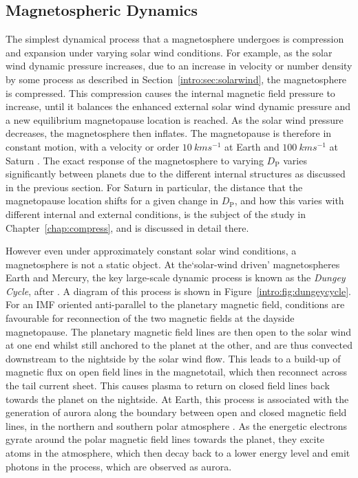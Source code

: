 {\subsection{Magnetospheric Dynamics}
The simplest dynamical process that a magnetosphere undergoes is compression and expansion under varying solar wind conditions. For example, as the solar wind dynamic pressure increases, due to an increase in velocity or number density by some process as described in Section~\ref{intro:sec:solarwind}, the magnetosphere is compressed. This compression causes the internal magnetic field pressure to increase, until it balances the enhanced external solar wind dynamic pressure and a new equilibrium magnetopause location is reached. As the solar wind pressure decreases, the magnetosphere then inflates. The magnetopause is therefore in constant motion, with a velocity or order $\SI{10}{kms^{-1}}$ at Earth \citep{berchem1982} and $\SI{100}{kms^{-1}}$ at Saturn \citep{masters2011}. The exact response of the magnetosphere to varying $D_\mathrm{P}$ varies significantly between planets due to the different internal structures as discussed in the previous section. For Saturn in particular, the distance that the magnetopause location shifts for a given change in $D_\mathrm{P}$, and how this varies with different internal and external conditions, is the subject of the study in Chapter~\ref{chap:compress}, and is discussed in detail there.

However even under approximately constant solar wind conditions, a magnetosphere is not a static object. At the`solar-wind driven' magnetospheres Earth and Mercury, the key large-scale dynamic process is known as the \textit{Dungey Cycle}, after \citet{dungey1961}. A diagram of this process is shown in Figure~\ref{intro:fig:dungeycycle}. For an IMF oriented anti-parallel to the planetary magnetic field, conditions are favourable for reconnection of the two magnetic fields at the dayside magnetopause. The planetary magnetic field lines are then open to the solar wind at one end whilst still anchored to the planet at the other, and are thus convected downstream to the nightside by the solar wind flow. This leads to a build-up of magnetic flux on open field lines in the magnetotail, which then reconnect across the tail current sheet. This causes plasma to return on closed field lines back towards the planet on the nightside. At Earth, this process is associated with the generation of aurora along the boundary between open and closed magnetic field lines, in the northern and southern polar atmosphere \citep[e.g.][]{milan2007}. As the energetic electrons gyrate around the polar magnetic field lines towards the planet, they excite atoms in the atmosphere, which then decay back to a lower energy level and emit photons in the process, which are observed as aurora.

}
